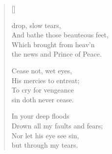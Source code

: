 \newHymn
{}

\begin{verse}[\versewidth]
\begin{indentedVerse}
 drop, slow tears,\\
And bathe those beauteous feet,\\
Which brought from heav'n\\
\vin the news and Prince of Peace.
\end{indentedVerse}

\begin{indentedVerse}
Cease not, wet eyes,\\
His mercies to entreat;\\
To cry for vengeance\\
\vin sin doth never cease.
\end{indentedVerse}

\begin{indentedVerse}
In your deep floods\\
Drown all my faults and fears;\\
Nor let his eye see sin,\\
\vin but through my tears.
\end{indentedVerse}

\end{verse}



